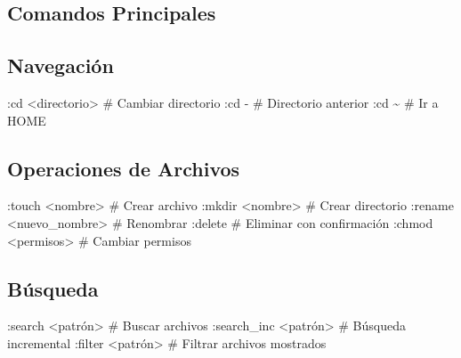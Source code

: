 \documentclass[
  doc,
  floatsintext,
  longtable,
  a4paper,
  nolmodern,
  notxfonts,
  notimes,
  12pt,
  colorlinks=true,linkcolor=blue,citecolor=blue,urlcolor=blue]{apa7}
\newenvironment{Shaded}{\begin{snugshade}}{\end{snugshade}}
\newcommand{\AttributeTok}[1]{\textcolor[rgb]{0.40,0.45,0.13}{#1}}
\newcommand{\CommentTok}[1]{\textcolor[rgb]{0.37,0.37,0.37}{#1}}
\newcommand{\ExtensionTok}[1]{\textcolor[rgb]{0.00,0.23,0.31}{#1}}
\newcommand{\NormalTok}[1]{\textcolor[rgb]{0.00,0.23,0.31}{#1}}
\newcommand{\OperatorTok}[1]{\textcolor[rgb]{0.37,0.37,0.37}{#1}}
\begin{document}
\subsection{Comandos Principales}\label{comandos-principales}

\subsection{Navegación}\label{navegaciuxf3n}

\begin{Shaded}
\begin{Highlighting}[]
\ExtensionTok{:cd} \OperatorTok{\textless{}}\NormalTok{directorio}\OperatorTok{\textgreater{}}           \CommentTok{\# Cambiar directorio}
\ExtensionTok{:cd} \AttributeTok{{-}}                      \CommentTok{\# Directorio anterior}
\ExtensionTok{:cd}\NormalTok{ \textasciitilde{}                      }\CommentTok{\# Ir a HOME}
\end{Highlighting}
\end{Shaded}

\subsection{Operaciones de Archivos}\label{operaciones-de-archivos}

\begin{Shaded}
\begin{Highlighting}[]
\ExtensionTok{:touch} \OperatorTok{\textless{}}\NormalTok{nombre}\OperatorTok{\textgreater{}}            \CommentTok{\# Crear archivo}
\ExtensionTok{:mkdir} \OperatorTok{\textless{}}\NormalTok{nombre}\OperatorTok{\textgreater{}}            \CommentTok{\# Crear directorio}
\ExtensionTok{:rename} \OperatorTok{\textless{}}\NormalTok{nuevo\_nombre}\OperatorTok{\textgreater{}}     \CommentTok{\# Renombrar}
\ExtensionTok{:delete}                    \CommentTok{\# Eliminar con confirmación}
\ExtensionTok{:chmod} \OperatorTok{\textless{}}\NormalTok{permisos}\OperatorTok{\textgreater{}}          \CommentTok{\# Cambiar permisos}
\end{Highlighting}
\end{Shaded}

\subsection{Búsqueda}\label{buxfasqueda-1}

\begin{Shaded}
\begin{Highlighting}[]
\ExtensionTok{:search} \OperatorTok{\textless{}}\NormalTok{patrón}\OperatorTok{\textgreater{}}           \CommentTok{\# Buscar archivos}
\ExtensionTok{:search\_inc} \OperatorTok{\textless{}}\NormalTok{patrón}\OperatorTok{\textgreater{}}       \CommentTok{\# Búsqueda incremental}
\ExtensionTok{:filter} \OperatorTok{\textless{}}\NormalTok{patrón}\OperatorTok{\textgreater{}}           \CommentTok{\# Filtrar archivos mostrados}
\end{Highlighting}
\end{Shaded}
\end{document}
